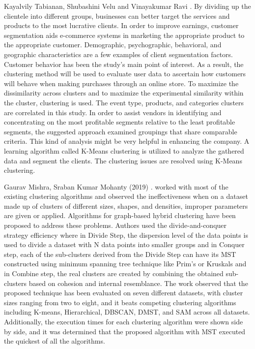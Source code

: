 \documentclass[conference]{IEEEtran}
\begin{document}
Kayalvily Tabianan, Shubashini Velu and Vinayakumar Ravi \cite{b13}. By dividing up the clientele into different groups, businesses can better target the services and products to the most lucrative clients. In order to improve earnings, customer segmentation aids e-commerce systems in marketing the appropriate product to the appropriate customer. Demographic, psychographic, behavioral, and geographic characteristics are a few examples of client segmentation factors. Customer behavior has been the study’s main point of interest. As a result, the clustering method will be used to evaluate user data to ascertain how customers will behave when making purchases through an online store. To maximize the dissimilarity across clusters and to maximize the experimental similarity within the cluster, clustering is used. The event type, products, and categories clusters are correlated in this study. In order to assist vendors in identifying and concentrating on the most profitable segments relative to the least profitable segments, the suggested approach examined groupings that share comparable criteria. This kind of analysis might be very helpful in enhancing the company. A learning algorithm called K-Means clustering is utilized to analyze the gathered data and segment the clients. The clustering issues are resolved using K-Means clustering.

Gaurav Mishra, Sraban Kumar Mohanty (2019) \cite{b12}. worked with most of the existing clustering algorithms and observed the ineffectiveness when on a dataset made up of clusters of different sizes, shapes, and densities, improper parameters are given or applied. Algorithms for graph-based hybrid clustering have been proposed to address these problems. Authors used the divide-and-conquer strategy efficiency where in Divide Step, the dispersion level of the data points is used to divide a dataset with N data points into smaller groups and in Conquer step, each of the sub-clusters derived from the Divide Step can have its MST constructed using minimum spanning tree technique like Prim's or Kruskals and in Combine step, the real clusters are created by combining the obtained sub-clusters based on cohesion and internal resemblance. The work observed that the proposed technique has been evaluated on seven different datasets, with cluster sizes ranging from two to eight, and it beats competing clustering algorithms including K-means, Hierarchical, DBSCAN, DMST, and SAM across all datasets. Additionally, the execution times for each clustering algorithm were shown side by side, and it was determined that the proposed algorithm with MST executed the quickest of all the algorithms.
\end{document}
